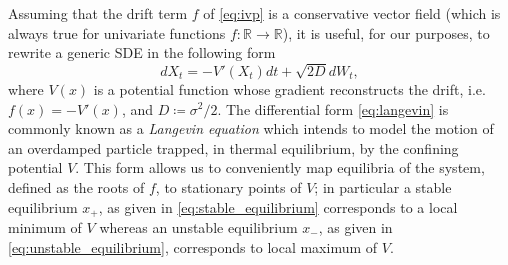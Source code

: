 Assuming that the drift term $f$ of \eqref{eq:ivp} is a conservative vector field (which is always true for univariate functions $f:\mathbb{R}\to \mathbb{R}$), it is useful, for our purposes, to rewrite a generic SDE in the following form
%
\begin{equation}\label{eq:langevin}
  dX_t = -V'(X_t)dt + \sqrt{2D}dW_t , 
\end{equation}
%
where $V(x)$ is a potential function whose gradient reconstructs the drift, i.e. $f(x) = -V'(x)$, and $D\coloneqq\sigma^2/2$.
The differential form \eqref{eq:langevin} is commonly known as a \emph{Langevin equation} which intends to model the motion of an overdamped particle trapped, in thermal equilibrium, by the confining potential $V$.
This form allows us to conveniently map equilibria of the system, defined as the roots of $f$, to stationary points of $V$; in particular a stable equilibrium $x_+$, as given in \eqref{eq:stable_equilibrium} corresponds to a local minimum of $V$ whereas an unstable equilibrium $x_-$, as given in \eqref{eq:unstable_equilibrium}, corresponds to local maximum of $V$.

